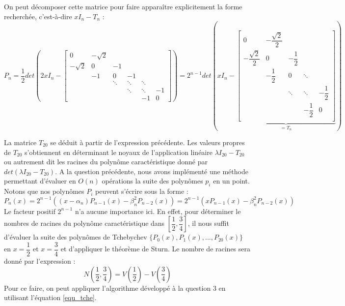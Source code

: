 \documentclass{article}
\begin{document}
On peut décomposer cette matrice pour faire apparaître explicitement la forme recherchée, c'est-à-dire $xI_n - T_n$ : 
$$P_n = \dfrac{1}{2} det \left( 2x I_n - \left[ 
\begin{array}{cccccc}
0 & -\sqrt{2} & & & &  \\
-\sqrt{2} & 0 & -1 & & & \\
 & -1 & 0 & -1 & & \\
 & & \ddots & \ddots & \ddots & \\
 & & & \ddots & \ddots &  -1\\
 & & & &  -1 & 0
\end{array}
\right] \right) = 2^{n-1} det \left( x I_n - \underbrace{\left[ 
\begin{array}{ccccc}
0 & - \dfrac{\sqrt{2}}{2} & & &  \\
- \dfrac{\sqrt{2}}{2} & 0 & -\dfrac{1}{2} & & \\
 & -\dfrac{1}{2} & 0 & \ddots &  \\
 & & \ddots & \ddots & -\dfrac{1}{2} \\
 & & & -\dfrac{1}{2} & 0 \\
\end{array}
\right]}_{=T_n}  \right)
$$

La matrice $T_{20}$ se déduit à partir de l'expression précédente. Les valeurs propres de $T_{20}$ s'obtiennent en déterminant le noyaux de l'application linéaire $\lambda I_{20} - T_{20}$ ou autrement dit les racines du polynôme caractéristique donné par $det(\lambda I_{20} - T_{20})$. A la question précédente, nous avons implémenté une méthode permettant d'évaluer en $O(n)$ opérations la suite des polynômes $p_i$ en un point. Notons que nos polynômes $P_i$ peuvent s'écrire sous la forme : 
\begin{equation} \label{equ_tche}
P_n(x) = 2^{n-1} ((x-\alpha_n)P_{n-1}(x) - \beta_n^2 P_{n-2}(x)) = 2^{n-1} (x P_{n-1}(x) - \beta_n^2 P_{n-2}(x))
\end{equation}
Le facteur positif $2^{n-1}$ n'a aucune importance ici. En effet, pour déterminer le nombres de racines du polynôme caractéristique dans $\left[ \dfrac{1}{2} , \dfrac{3}{4} \right]$, il nous suffit d'évaluer la suite des polynômes de Tchebychev $ \{ P_0(x), P_1(x), ... , P_{20}(x) \}$ en $x=\dfrac{1}{2}$ et $x=\dfrac{3}{4}$ et d'appliquer le théorème de Sturn. Le nombre de racines sera donné par l'expression :
$$N(\dfrac{1}{2} , \dfrac{3}{4}) = V(\dfrac{1}{2}) - V(\dfrac{3}{4}) $$
Pour ce faire, on peut appliquer l'algorithme développé à la question 3 en utilisant l'équation \ref{equ_tche}. 
\end{document}
